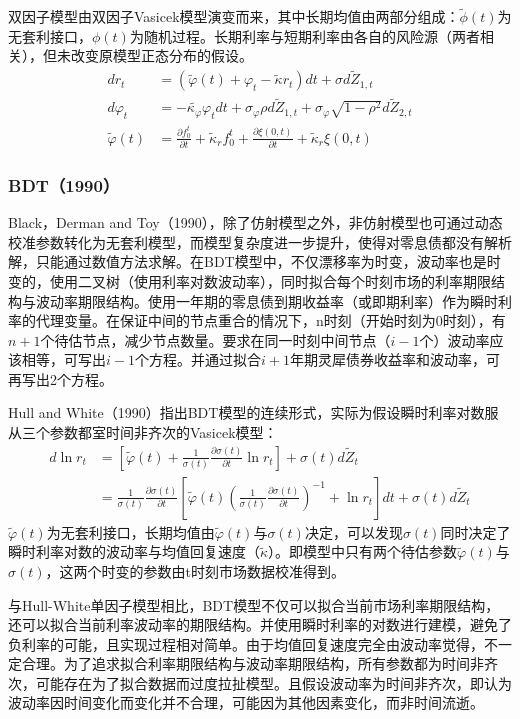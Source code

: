 \documentclass[11pt]{article}
\begin{document}
双因子模型由双因子Vasicek模型演变而来，其中长期均值由两部分组成：$\tilde{\phi}(t)$为无套利接口，$\phi(t)$为随机过程。长期利率与短期利率由各自的风险源（两者相关），但未改变原模型正态分布的假设。
\begin{align*}
	dr_t &= \left(\tilde{\varphi}(t) + \varphi_t - \tilde{\kappa}r_t \right) dt + \sigma d\tilde{Z}_{1,t} \\
	d\varphi_t &= -\tilde{\kappa_\varphi}\varphi_t dt + \sigma_\varphi \rho d\tilde{Z}_{1,t} + \sigma_{\varphi}\sqrt{1-\rho^2} d\tilde{Z}_{2,t}\\
	\tilde{\varphi}(t) &= \frac{\partial f^t_0}{\partial t} + \tilde{\kappa}_r f^t_0 + \frac{\partial \xi(0,t)}{\partial t} + \tilde{\kappa}_r \xi(0,t)
\end{align*}

\subsubsection{BDT（1990）}

Black，Derman and Toy（1990），除了仿射模型之外，非仿射模型也可通过动态校准参数转化为无套利模型，而模型复杂度进一步提升，使得对零息债都没有解析解，只能通过数值方法求解。在BDT模型中，不仅漂移率为时变，波动率也是时变的，使用二叉树（使用利率对数波动率），同时拟合每个时刻市场的利率期限结构与波动率期限结构。使用一年期的零息债到期收益率（或即期利率）作为瞬时利率的代理变量。在保证中间的节点重合的情况下，n时刻（开始时刻为0时刻），有$n+1$个待估节点，减少节点数量。要求在同一时刻中间节点（$i-1$个）波动率应该相等，可写出$i-1$个方程。并通过拟合$i+1$年期灵犀债券收益率和波动率，可再写出2个方程。

Hull and White（1990）指出BDT模型的连续形式，实际为假设瞬时利率对数服从三个参数都室时间非齐次的Vasicek模型：
\begin{align*}
	d\ln r_t & = \left[ \tilde{\varphi}(t) + \frac{1}{\sigma(t)} \frac{\partial \sigma(t)}{\partial t} \ln r_t \right] + \sigma(t) d\tilde{Z}_t \\
	&= \frac{1}{\sigma(t)} \frac{\partial \sigma(t)}{\partial t} \left[ \tilde{\varphi}(t)\left( \frac{1}{\sigma(t)} \frac{\partial \sigma(t)}{\partial t} \right)^{-1} + \ln r_t \right]dt + \sigma(t)d\tilde{Z}_t
\end{align*}
$\tilde{\varphi}(t)$为无套利接口，长期均值由$\tilde{\varphi}(t)$与$\sigma(t)$决定，可以发现$\sigma(t)$同时决定了瞬时利率对数的波动率与均值回复速度（$\tilde{\kappa}$）。即模型中只有两个待估参数$\tilde{\varphi}(t)$与$\sigma(t)$，这两个时变的参数由t时刻市场数据校准得到。

与Hull-White单因子模型相比，BDT模型不仅可以拟合当前市场利率期限结构，还可以拟合当前利率波动率的期限结构。并使用瞬时利率的对数进行建模，避免了负利率的可能，且实现过程相对简单。由于均值回复速度完全由波动率觉得，不一定合理。为了追求拟合利率期限结构与波动率期限结构，所有参数都为时间非齐次，可能存在为了拟合数据而过度拉扯模型。且假设波动率为时间非齐次，即认为波动率因时间变化而变化并不合理，可能因为其他因素变化，而非时间流逝。
\end{document}
